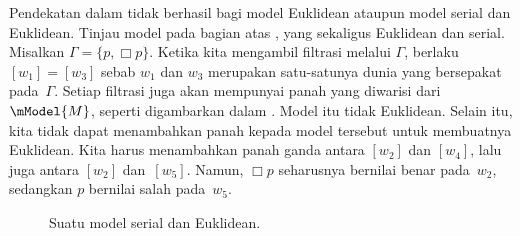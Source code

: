 \documentclass[../../../include/open-logic-section]{subfiles}
\begin{document}


Pendekatan dalam  tidak berhasil bagi model Euklidean ataupun
model serial dan Euklidean. Tinjau model pada bagian atas
, yang sekaligus Euklidean dan serial. Misalkan
$\Gamma = \{p, \Box p \}$. Ketika kita mengambil filtrasi melalui $\Gamma$,
berlaku $[w_1] = [w_3]$ sebab $w_1$ dan $w_3$ merupakan satu-satunya dunia yang
bersepakat pada~$\Gamma$. Setiap filtrasi juga akan mempunyai panah yang
diwarisi dari $\mModel{M}$, seperti digambarkan dalam
. Model itu tidak Euklidean. Selain itu, kita tidak dapat
menambahkan panah kepada model tersebut untuk membuatnya Euklidean. Kita
harus menambahkan panah ganda antara $[w_2]$ dan $[w_4]$, lalu juga antara
$[w_2]$ dan~$[w_5]$. Namun, $\Box p$ seharusnya bernilai benar pada~$w_2$,
sedangkan $p$ bernilai salah pada~$w_5$.

\begin{figure}[htpb]
  \centering
  \caption{Suatu model serial dan Euklidean.}
\end{figure}
\end{document}
